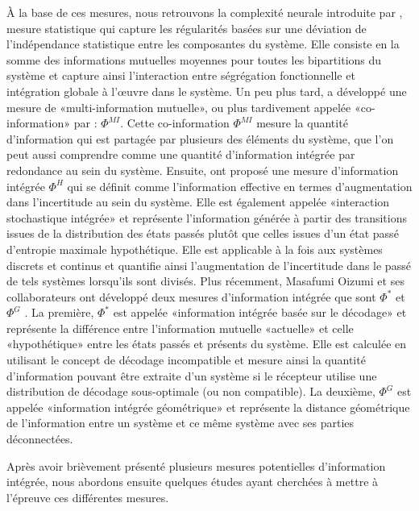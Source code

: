 À la base de ces mesures, nous retrouvons la complexité neurale introduite par \cite{tononi1994measure}, mesure statistique qui capture les régularités basées sur une déviation de l'indépendance statistique entre les composantes du système. 
Elle consiste en la somme des informations mutuelles moyennes pour toutes les bipartitions du système et capture ainsi l'interaction entre ségrégation fonctionnelle et intégration globale à l'œuvre dans le système. 
Un peu plus tard, \cite{amari2001information} a développé une mesure de «multi-information mutuelle», ou plus tardivement appelée «co-information» par \cite{bell2003co} : $\Phi^{MI}$. 
Cette co-information $\Phi^{MI}$ mesure la quantité d'information qui est partagée par plusieurs des éléments du système, que l'on peut aussi comprendre comme une quantité d'information intégrée par redondance au sein du système. 
Ensuite, \cite{barrett2011practical} ont proposé une mesure d'information intégrée $\Phi^H$ qui se définit comme l'information effective en termes d'augmentation dans l'incertitude au sein du système. 
Elle est également appelée «interaction stochastique intégrée» et représente l'information générée à partir des transitions issues de la distribution des états passés plutôt que celles issues d'un état passé d'entropie maximale hypothétique. 
Elle est applicable à la fois aux systèmes discrets et continus et quantifie ainsi l'augmentation de l'incertitude dans le passé de tels systèmes lorsqu'ils sont divisés. 
Plus récemment, Masafumi Oizumi et ses collaborateurs ont développé deux mesures d'information intégrée que sont $\Phi^*$ \citep{oizumi2016measuring} et $\Phi^G$ \citep{oizumi2016unified}. 
La première, $\Phi^*$ est appelée «information intégrée basée sur le décodage» et représente la différence entre l'information mutuelle «actuelle» et celle «hypothétique» entre les états passés et présents du système. 
Elle est calculée en utilisant le concept de décodage incompatible et mesure ainsi la quantité d'information pouvant être extraite d'un système si le récepteur utilise une distribution de décodage sous-optimale (ou non compatible). 
La deuxième, $\Phi^G$ est appelée «information intégrée géométrique» et représente la distance géométrique de l'information entre un système et ce même système avec ses parties déconnectées. 

Après avoir brièvement présenté plusieurs mesures potentielles d'information intégrée, nous abordons ensuite quelques études ayant cherchées à mettre à l'épreuve ces différentes mesures. 

